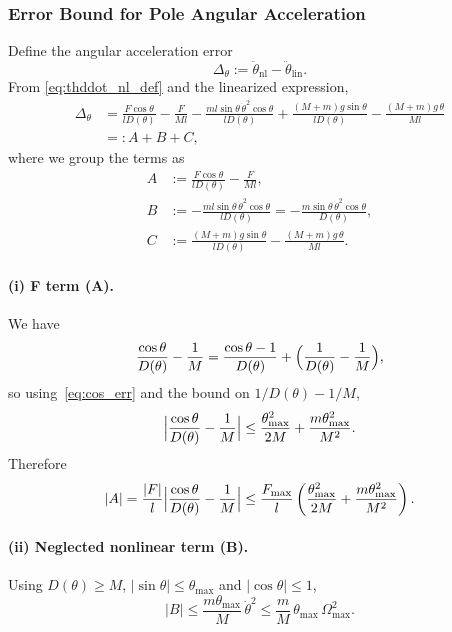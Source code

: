 \documentclass{article}
\begin{document}
\subsubsection*{Error Bound for Pole Angular Acceleration}

Define the angular acceleration error
\[
\Delta_\theta := \ddot\theta_{\mathrm{nl}} - \ddot\theta_{\mathrm{lin}}.
\]
From \eqref{eq:thddot_nl_def} and the linearized expression,
\begin{align}
\Delta_\theta
&=
\frac{F\cos\theta}{l D(\theta)}
 - \frac{F}{M l}
 - \frac{m l\sin\theta\,\dot\theta^2\cos\theta}{l D(\theta)}
 + \frac{(M+m) g\sin\theta}{l D(\theta)}
 - \frac{(M+m) g\,\theta}{M l} \nonumber\\
&=: A + B + C,
\end{align}
where we group the terms as
\begin{align}
A &:= \frac{F\cos\theta}{l D(\theta)} - \frac{F}{M l},\\
B &:= - \frac{m l\sin\theta\,\dot\theta^2\cos\theta}{l D(\theta)}
    = -\frac{m\sin\theta\,\dot\theta^2\cos\theta}{D(\theta)},\\
C &:= \frac{(M+m) g\sin\theta}{l D(\theta)}
      - \frac{(M+m) g\,\theta}{M l}.
\end{align}

\paragraph*{(i) F term (A).}
We have
\[
\frac{\cos\theta}{D(\theta)} - \frac{1}{M}
=
\frac{\cos\theta - 1}{D(\theta)}
+ \Bigl(\frac{1}{D(\theta)} - \frac{1}{M}\Bigr),
\]
so using~\eqref{eq:cos_err} and the bound on $1/D(\theta) - 1/M$,
\[
\Bigl|\frac{\cos\theta}{D(\theta)} - \frac{1}{M}\Bigr|
\le
\frac{\theta_{\max}^2}{2M} +
\frac{m\theta_{\max}^2}{M^2}.
\]
Therefore
\begin{equation}
|A|
= \frac{|F|}{l}\Bigl|\frac{\cos\theta}{D(\theta)} - \frac{1}{M}\Bigr|
\le
\frac{F_{\max}}{l}\left(
\frac{\theta_{\max}^2}{2M} +
\frac{m\theta_{\max}^2}{M^2}
\right).
\label{eq:theta_err_force}
\end{equation}

\paragraph*{(ii) Neglected nonlinear term (B).}
Using $D(\theta)\ge M$, $|\sin\theta|\le\theta_{\max}$ and $|\cos\theta|\le 1$,
\begin{equation}
|B|
\le \frac{m\theta_{\max}}{M}\,\dot\theta^2
\le \frac{m}{M}\,\theta_{\max}\,\Omega_{\max}^2.
\label{eq:theta_err_omega}
\end{equation}
\end{document}
